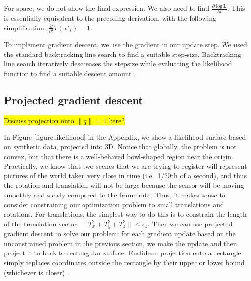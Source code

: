 \documentclass{article} %
\begin{document}
For space, we do not show the final expression. We also need to find $\frac{\partial \log \mathbf{L}}{\partial t}$. This is essentially
equivalent to the preceding derivation, with the following simplification: $\frac{\partial }{\partial t} T(x'_i) = 1$.

To implement gradient descent, we use the gradient in our update step. We used the standard backtracking line search to find a suitable step-size. Backtracking line search iteratively descreases the stepsize while evaluating the likelihood function to find a suitable descent amount \cite[p. 464]{boyd2004convex}.

\subsection{Projected gradient descent}
\hl{Discuss projection onto $\|q\|=1$ here?}

In Figure \ref{figure:likelihood} in the Appendix, we show a likelihood surface based on synthetic data, projected into 3D. Notice that globally, the problem is not convex, but that there is a well-behaved bowl-shaped region near the origin. Practically, we know that two scenes that we are trying to register will represent pictures of the world taken very close in time (i.e.~1/30th of a second), and thus the rotation and translation will not be large because the sensor will be moving smoothly and slowly compared to the frame rate. Thus, it makes sense to consider constraining our optimization problem to small translations and rotations. For translations, the simplest way to do this is to constrain the length of the translation vector: $\|T_x^2 + T_y^2 + T_z^2\| \leq \epsilon_1$. 
Then we can use projected gradient descent to solve our problem: for each gradient update based on the unconstrained problem in the previous section, 
we make the update and then project it to back to rectangular surface. Euclidean projection onto a rectangle simply replaces coordinates outside the rectangle by their upper or lower bound (whichever is closer) \cite[p. 399]{boyd2004convex}.
\end{document}
